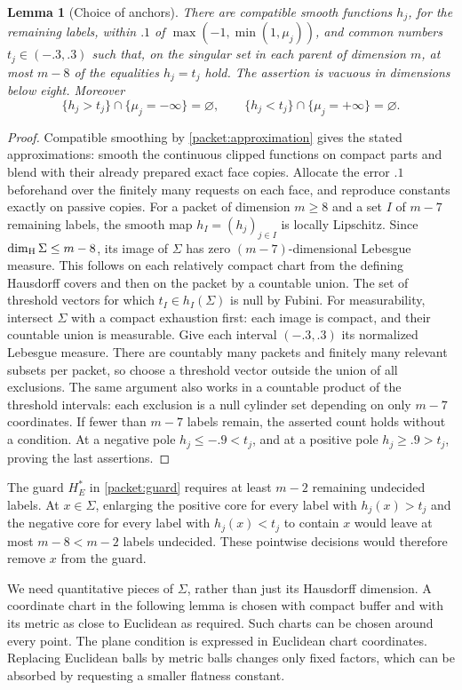 \documentclass[11pt]{article}
\numberwithin{equation}{section}
\newtheorem{lemma}[theorem]{Lemma}
\theoremstyle{definition}
\theoremstyle{remark}
\begin{document}
\begin{lemma}[Choice of anchors]\label{local:anchors}
There are compatible smooth functions $h_j$, for the remaining labels,
within $.1$ of $\max(-1,\min(1,\mu_j))$, and common numbers
$t_j\in(-.3,.3)$ such that, on the singular set in each parent of
dimension $m$, at most $m-8$ of the equalities $h_j=t_j$ hold.
The assertion is vacuous in dimensions below eight.  Moreover
\[
 \{h_j>t_j\}\cap\{\mu_j=-\infty\}=\varnothing,
 \qquad
 \{h_j<t_j\}\cap\{\mu_j=+\infty\}=\varnothing.
\]
\end{lemma}
\begin{proof}
Compatible smoothing by \cref{packet:approximation} gives the stated
approximations: smooth the continuous clipped functions on compact
parts and blend with their already prepared exact face copies.
Allocate the error $.1$ beforehand over the finitely many requests
on each face, and reproduce constants exactly on passive copies.
For a packet of dimension $m\ge8$ and a set $I$ of $m-7$
remaining labels, the smooth map $h_I=(h_j)_{j\in I}$ is locally
Lipschitz.  Since $\dim_{\rm H}\Sigma\le m-8$, its image of $\Sigma$
has zero $(m-7)$-dimensional Lebesgue measure.  This follows on each
relatively compact chart from the defining Hausdorff covers and then
on the packet by a countable union.  The set of threshold vectors for
which $t_I\in h_I(\Sigma)$ is null by Fubini.  For measurability,
intersect $\Sigma$ with a compact exhaustion first: each image is compact,
and their countable union is measurable.  Give each interval $(-.3,.3)$
its normalized Lebesgue measure.  There are countably many packets and
finitely many relevant subsets per packet, so choose a threshold vector
outside the union of all exclusions.  The same argument also works in
a countable product of the threshold intervals: each exclusion is a
null cylinder set depending on only $m-7$ coordinates.  If fewer
than $m-7$ labels remain, the asserted count holds without a condition.
At a negative pole $h_j\le-.9<t_j$, and at a positive pole
$h_j\ge.9>t_j$, proving the last assertions.
\end{proof}

The guard $H_E^*$ in \eqref{packet:guard} requires at least $m-2$
remaining undecided labels.  At $x\in\Sigma$, enlarging the positive
core for every label with $h_j(x)>t_j$ and the negative core for every
label with $h_j(x)<t_j$ to contain $x$ would leave at most
$m-8<m-2$ labels undecided.  These pointwise decisions would therefore
remove $x$ from the guard.

We need quantitative pieces of $\Sigma$, rather than just its
Hausdorff dimension.  A coordinate chart in the following lemma is
chosen with compact buffer and with its metric as close to Euclidean
as required.  Such charts can be chosen around every point.  The plane
condition is expressed in Euclidean chart coordinates.  Replacing
Euclidean balls by metric balls changes only fixed factors, which can
be absorbed by requesting a smaller flatness constant.
\end{document}
